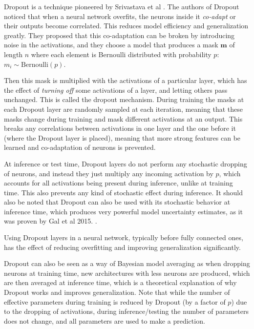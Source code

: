 Dropout  is a technique pioneered by Srivastava et al \cite[1em]{srivastava2014dropout}. The authors of Dropout noticed that when a neural network overfits, the neurons inside it \textit{co-adapt} or their outputs become correlated. This reduces model efficiency and generalization greatly. They proposed that this co-adaptation can be broken by introducing noise in the activations, and they choose a model that produces a mask $\mathbf{m}$ of length $n$ where each element is Bernoulli distributed with probability $p$: $m_i \sim \text{Bernoulli}(p)$.

Then this mask is multiplied with the activations of a particular layer, which has the effect of \textit{turning off} some activations of a layer, and letting others pass unchanged. This is called the dropout mechanism. During training the masks at each Dropout layer are randomly sampled at each iteration, meaning that these masks change during training and mask different activations at an output. This breaks any correlations between activations in one layer and the one before it (where the Dropout layer is placed), meaning that more strong features can be learned and co-adaptation of neurons is prevented.

At inference or test time, Dropout layers do not perform any stochastic dropping of neurons, and instead they just multiply any incoming activation by $p$, which accounts for all activations being present during inference, unlike at training time. This also prevents any kind of stochastic effect during inference. It should also be noted that Dropout can also be used with its stochastic behavior at inference time, which produces very powerful model uncertainty estimates, as it was proven by Gal et al 2015. \cite{gal2015dropout}.

Using Dropout layers in a neural network, typically before fully connected ones, has the effect of reducing overfitting and improving generalization significantly.

Dropout can also be seen as a way of Bayesian model averaging \cite{gal2016uncertainty} as when dropping neurons at training time, new architectures with less neurons are produced, which are then averaged at inference time, which is a theoretical explanation of why Dropout works and improves generalization. Note that while the number of effective parameters during training is reduced by Dropout (by a factor of $p$) due to the dropping of activations, during inference/testing the number of parameters does not change, and all parameters are used to make a prediction.

